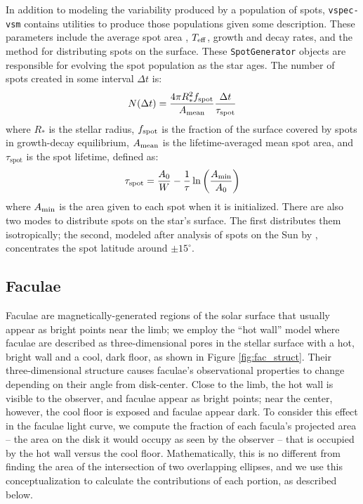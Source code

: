 \documentclass[linenumbers,5p,twocolumn,authoryear]{elsarticle}
\newcommand{\teff}{$T_{\rm eff}$}
\begin{document}
In addition to modeling the variability produced by a population of spots, \texttt{vspec-vsm} contains utilities to produce those populations given some description.
These parameters include the average spot area \citep[lognormally distributed, ][]{bogdan1988}, \teff, growth and decay rates, and the method for distributing spots on the surface. These \texttt{SpotGenerator} objects are responsible for evolving the spot population as the star ages. The number of spots created in some interval $\Delta t$ is:
\begin{equation}
    N(\Delta t) = \frac{4 \pi R_*^2 f_{\rm spot}}{A_{\rm mean}} \frac{\Delta t}{\tau_\text{spot}}
\end{equation}
where $R_*$ is the stellar radius, $f_{\rm spot}$ is the fraction of the surface covered by spots in growth-decay equilibrium, $A_{\rm mean}$ is the lifetime-averaged mean spot area, and $\tau_\text{spot}$ is the spot lifetime, defined as:
\begin{equation}
    \tau_\text{spot} = \frac{A_0}{W} - \frac{1}{\tau} \ln{\left (\frac{A_{\rm min}}{A_0}\right )}
\end{equation}
where $A_{\rm min}$ is the area given to each spot when it is initialized. There are also two modes to distribute spots on the star's surface. The first distributes them isotropically; the second, modeled after analysis of spots on the Sun by \citet{mandal2017}, concentrates the spot latitude around $\pm 15^{\circ}$.


\subsection{Faculae \label{subsec:faculae}}
Faculae are magnetically-generated regions of the solar surface that usually appear as bright points near the limb; we employ the ``hot wall''
model \citep{spruit1976} where faculae are described as three-dimensional pores in the stellar surface with a hot, bright wall and a cool, dark floor, as shown in Figure \ref{fig:fac_struct}. Their three-dimensional structure causes faculae's observational properties to change depending on their angle from disk-center. Close to the limb,
the hot wall is visible to the observer, and faculae appear as bright points; near the center, however, the cool floor is exposed and faculae appear dark. To consider this effect in the faculae light curve, we compute the fraction of each facula's projected area -- the area on the disk it would occupy as seen by the observer -- that is occupied by the hot wall versus the cool floor. Mathematically, this is no different from finding the area of the intersection of two overlapping ellipses, and we use this conceptualization to calculate the contributions of each portion, as described below.
\end{document}
